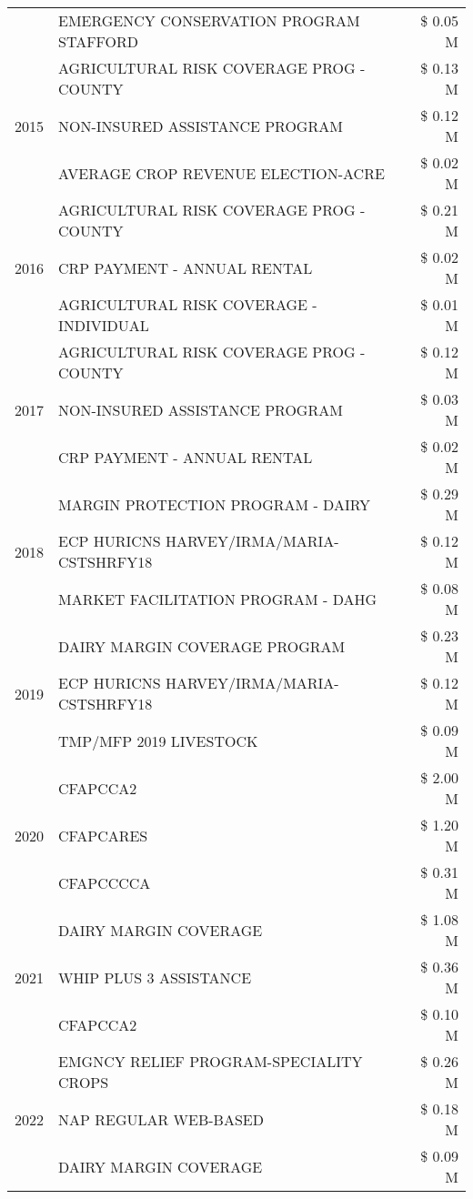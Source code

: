 \begin{tabular}{llr}
 & EMERGENCY CONSERVATION PROGRAM STAFFORD & \$ 0.05 M \\
\cline{1-3}
\multirow[t]{3}{*}{2015} & AGRICULTURAL RISK COVERAGE PROG - COUNTY & \$ 0.13 M \\
 & NON-INSURED ASSISTANCE PROGRAM & \$ 0.12 M \\
 & AVERAGE CROP REVENUE ELECTION-ACRE & \$ 0.02 M \\
\cline{1-3}
\multirow[t]{3}{*}{2016} & AGRICULTURAL RISK COVERAGE PROG - COUNTY & \$ 0.21 M \\
 & CRP PAYMENT - ANNUAL RENTAL & \$ 0.02 M \\
 & AGRICULTURAL RISK COVERAGE - INDIVIDUAL & \$ 0.01 M \\
\cline{1-3}
\multirow[t]{3}{*}{2017} & AGRICULTURAL RISK COVERAGE PROG - COUNTY & \$ 0.12 M \\
 & NON-INSURED ASSISTANCE PROGRAM & \$ 0.03 M \\
 & CRP PAYMENT - ANNUAL RENTAL & \$ 0.02 M \\
\cline{1-3}
\multirow[t]{3}{*}{2018} & MARGIN PROTECTION PROGRAM - DAIRY & \$ 0.29 M \\
 & ECP HURICNS HARVEY/IRMA/MARIA-CSTSHRFY18 & \$ 0.12 M \\
 & MARKET FACILITATION PROGRAM - DAHG & \$ 0.08 M \\
\cline{1-3}
\multirow[t]{3}{*}{2019} & DAIRY MARGIN COVERAGE PROGRAM & \$ 0.23 M \\
 & ECP HURICNS HARVEY/IRMA/MARIA-CSTSHRFY18 & \$ 0.12 M \\
 & TMP/MFP 2019 LIVESTOCK & \$ 0.09 M \\
\cline{1-3}
\multirow[t]{3}{*}{2020} & CFAPCCA2 & \$ 2.00 M \\
 & CFAPCARES & \$ 1.20 M \\
 & CFAPCCCCA & \$ 0.31 M \\
\cline{1-3}
\multirow[t]{3}{*}{2021} & DAIRY MARGIN COVERAGE & \$ 1.08 M \\
 & WHIP PLUS 3 ASSISTANCE & \$ 0.36 M \\
 & CFAPCCA2 & \$ 0.10 M \\
\cline{1-3}
\multirow[t]{3}{*}{2022} & EMGNCY RELIEF PROGRAM-SPECIALITY CROPS & \$ 0.26 M \\
 & NAP REGULAR WEB-BASED & \$ 0.18 M \\
 & DAIRY MARGIN COVERAGE & \$ 0.09 M \\
\cline{1-3}
\bottomrule
\end{tabular}
